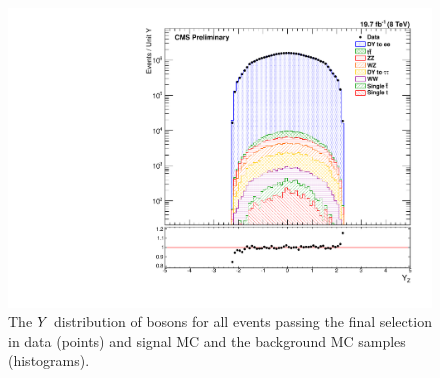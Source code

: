 \begin{figure}[p]
    \centering
    \includegraphics[width=\textwidth]{figures/z_rapidity_powheg.pdf}
    \caption[
        The $\rapidity$ distribution of \Z bosons in data and MC with
        \PPsixZtwo signal MC.
    ]{
        The $\rapidity$ distribution of \Z bosons for all events passing the
        final selection in data (points) and \PPsixZtwo signal MC and the
        background MC samples (histograms).
    }
    \label{fig:z_rapidity_powheg}
\end{figure}

